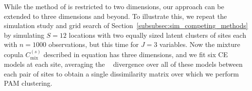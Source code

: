 \documentclass[
  12pt]{article}
\newcommand{\JSGa}{\mathop{\mathrm{JS}^{\mathrm{G}_{\lambda}}}\nolimits}
\begin{document}
While the method of \citet{Vignotto2021} is restricted to two dimensions, our approach can be extended to three dimensions and beyond. 
To illustrate this, we repeat the simulation study and grid search of Section~\ref{subsubsec:sim_competing_methods} by simulating $S = 12$ locations with two equally sized latent clusters of sites each with $n = 1000$ observations, but this time for $J = 3$ variables.
Now the mixture copula $C_{\mathrm{mix}}^{(s)}$ described in equation has three dimensions, and we fit six CE models at each site, averaging the $\JSGa{}$ divergence over all of these models between each pair of sites to obtain a single dissimilarity matrix over which we perform PAM clustering.
\end{document}
